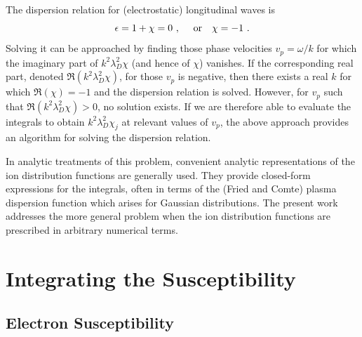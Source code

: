 \documentclass[12pt]{article}
\begin{document}
The dispersion relation for (electrostatic) longitudinal waves is 
\begin{equation}
  \epsilon = 1 + \chi =0 \ ,\ \mbox{\quad or\quad} \chi =-1\ .
\end{equation}
Solving it can be approached by finding those phase velocities $v_p=\omega/k$
for which the imaginary part of $ k^2\lambda_{D}^2\chi$ (and hence of
$\chi$) vanishes. If the corresponding real part, denoted
$\Re ( k^2\lambda_{D}^2\chi)$, for those $v_p$ is negative, then there
exists a real $k$ for which $\Re (\chi)=-1$ and the dispersion
relation is solved. However, for $v_p$ such that
$\Re(k^2\lambda_{D}^2\chi)>0$, no solution exists. If we are therefore
able to evaluate the integrals to obtain $k^2\lambda_{D}^2 \chi_j$ at
relevant values of $v_p$, the above approach provides an algorithm for
solving the dispersion relation.

In analytic treatments
of this problem, 
convenient analytic representations of the ion distribution functions
are generally used. They provide closed-form expressions for the
integrals, often in terms of the (Fried and Comte) plasma dispersion
function which arises for Gaussian distributions. The present work
addresses the more general problem when the ion distribution functions
are prescribed in arbitrary numerical terms.

\section{Integrating the Susceptibility}

\subsection{Electron Susceptibility}
\end{document}
